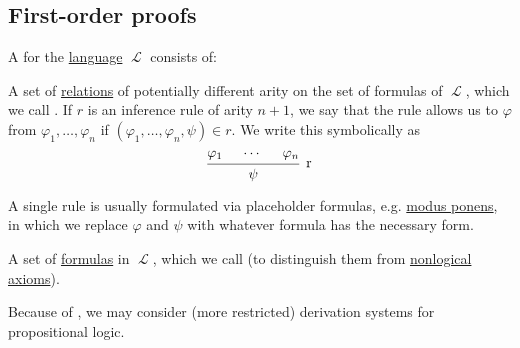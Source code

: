 \subsection{First-order proofs}\label{subsec:first_order_proofs}

\begin{definition}\label{def:first_order_derivation_system}
  A  for the \hyperref[def:first_order_syntax]{language} \( \mscrL \) consists of:

  \begin{thmenum}
     A set of \hyperref[def:relation]{relations} of potentially different arity on the set of formulas of \( \mscrL \), which we call . If \( r \) is an inference rule of arity \( n + 1 \), we say that the rule allows us to  \( \varphi \) from \( \varphi_1, \ldots, \varphi_n \) if \( (\varphi_1, \ldots, \varphi_n, \psi) \in r \). We write this symbolically as
    \begin{equation*}
      \begin{prooftree}
        \hypo{\varphi_1}
        \hypo{\cdots}
        \hypo{\varphi_n}
        \infer3[r]{\psi}
      \end{prooftree}
    \end{equation*}

    A single rule is usually formulated via placeholder formulas, e.g. \hyperref[eq:def:implicational_logic/rules/modus_ponens]{modus ponens}, in which we replace \( \varphi \) and \( \psi \) with whatever formula has the necessary form.

     A set of \hyperref[def:first_order_syntax]{formulas} in \( \mscrL \), which we call  (to distinguish them from \hyperref[def:first_order_derivability/axioms_and_theorems]{nonlogical axioms}).
  \end{thmenum}

  Because of , we may consider (more restricted) derivation systems for propositional logic.
\end{definition}

